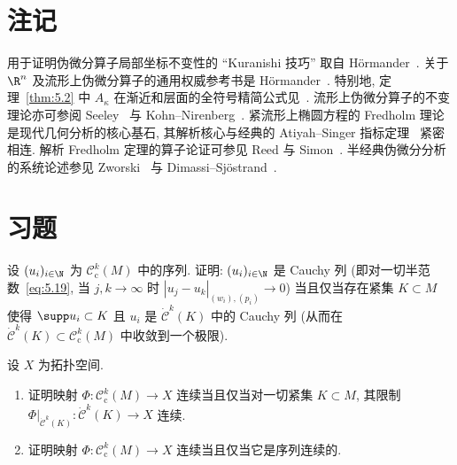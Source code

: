 \section*{注记}

用于证明伪微分算子局部坐标不变性的 ``Kuranishi 技巧'' 取自 Hörmander~\cite{Hor71a}. 关于 $\R^n$ 及流形上伪微分算子的通用权威参考书是 Hörmander~\cite[第 XVIII 章]{Hor07}. 特别地, 定理~\ref{thm:5.2} 中 $A_\kappa$ 在渐近和层面的全符号精简公式见~\cite[定理 18.1.17]{Hor07}. 流形上伪微分算子的不变理论亦可参阅 Seeley~\cite{See67} 与 Kohn--Nirenberg~\cite{KN65}. 紧流形上椭圆方程的 Fredholm 理论是现代几何分析的核心基石, 其解析核心与经典的 Atiyah--Singer 指标定理~\cite{AS63} 紧密相连. 解析 Fredholm 定理的算子论证可参见 Reed 与 Simon~\cite{RS72}. 半经典伪微分分析的系统论述参见 Zworski~\cite{Zwo12} 与 Dimassi--Sjöstrand~\cite{DS99}.

\section*{习题}

\begin{exer}\label{ex:5.1}
设 $(u_i)_{i \in \N}$ 为 $\mathcal{C}_{\mathrm{c}}^k(M)$ 中的序列. 证明: $(u_i)_{i \in \N}$ 是 Cauchy 列 (即对一切半范数~\eqref{eq:5.19}, 当 $j, k \to \infty$ 时 $|u_j - u_k|_{(w_i),(p_i)} \to 0$) 当且仅当存在紧集 $K \subset M$ 使得 $\supp u_i \subset K$ 且 $u_i$ 是 $\dot{\mathcal{C}}^k(K)$ 中的 Cauchy 列 (从而在 $\dot{\mathcal{C}}^k(K) \subset \mathcal{C}_{\mathrm{c}}^k(M)$ 中收敛到一个极限).
\end{exer}

\begin{exer}\label{ex:5.2}
设 $X$ 为拓扑空间.
\begin{enumerate}
    \item 证明映射 $\Phi \colon \mathcal{C}_{\mathrm{c}}^k(M) \to X$ 连续当且仅当对一切紧集 $K \subset M$, 其限制 $\Phi|_{\dot{\mathcal{C}}^k(K)} \colon \dot{\mathcal{C}}^k(K) \to X$ 连续.
    \item 证明映射 $\Phi \colon \mathcal{C}_{\mathrm{c}}^k(M) \to X$ 连续当且仅当它是序列连续的.
\end{enumerate}
\end{exer}

